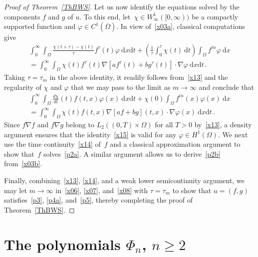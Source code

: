 \documentclass[10pt]{amsart}
\theoremstyle{definition}\newtheorem{defi}[theo]{Definition}\newtheorem{rema}[theo]{Remark}\newtheorem{exam}[theo]{Example}\newtheorem{exem}[theo]{Example}\newtheorem{nota}[theo]{Notation}
\newcommand{\rmd}{\mathrm{d}}
\begin{document}
\begin{proof}[Proof of Theorem~\ref{ThBWS}]
Let us now identify the equations solved by the components $f$ and $g$ of $u$. To this end, let~${\chi\in W^1_\infty([0,\infty))}$ be a compactly supported function and $\varphi\in C^1(\overline{\Omega})$. In view of~\eqref{x03a}, classical computations give
\begin{multline*}
\int_0^\infty \int_\Omega \frac{\chi(t+\tau)-\chi(t)}{\tau} f^\tau(t) \varphi\ \rmd x\rmd t + \left(\frac{1}{\tau} \int_0^\tau \chi(t)\ \rmd t \right) \int_\Omega f^{in}\varphi\ \rmd x \\
= \int_0^\infty \int_\Omega \chi(t) f^\tau(t) \nabla\left[af^\tau(t) + b g^\tau(t)\right] \cdot\nabla\varphi\ \rmd x\rmd t\,.
\end{multline*}
Taking $\tau=\tau_m$ in the above identity, it readily follows from~\eqref{x13} and the regularity of $\chi$ and $\varphi$ that we may pass to the limit as $m\to\infty$ and conclude that
\begin{multline}\label{x15}
\int_0^\infty \int_\Omega \frac{d\chi}{dt}(t) f(t,x) \varphi(x)\ \rmd x\rmd t + \chi(0) \int_\Omega f^{in}(x)\varphi(x)\ \rmd x \\
= \int_0^\infty \int_\Omega \chi(t) f(t,x) \nabla\left[af+ b g\right](t,x) \cdot\nabla \varphi(x)\ \rmd x\rmd t\,.
\end{multline}
Since $f\nabla f$ and $f\nabla g$ belong to $L_2((0,T)\times\Omega)$ for all $T>0$ by~\eqref{x13}, a density argument ensures that the identity~\eqref{x15} is valid for any $\varphi\in H^1(\Omega)$. We next use the time continuity~\eqref{x14} of~$f$ and a classical approximation argument to show that~$f$ solves~\eqref{p2a}. A similar argument allows us to derive~\eqref{p2b} from~\eqref{x03b}.

Finally, combining~\eqref{x13}, \eqref{x14}, and a weak lower semicontinuity argument, we may let $m\to\infty$ in~\eqref{x06}, \eqref{x07}, and~\eqref{x08} with $\tau=\tau_m$ to show that $u=(f,g)$ satisfies~\eqref{p3}, \eqref{p4a}, and~\eqref{p5}, thereby completing the proof of Theorem~\ref{ThBWS}.
\end{proof}



\appendix
\section{The polynomials \texorpdfstring{$\Phi_n$}{Phin}, \texorpdfstring{$n\ge 2$}{n>= 2}}\label{secA}
\end{document}
